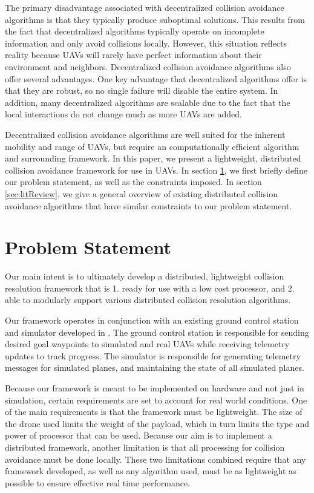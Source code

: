 \documentclass[conference]{IEEEtran}
\begin{document}
The primary disadvantage associated with decentralized collision avoidance algorithms is that they typically produce suboptimal solutions.  This results from the fact that decentralized algorithms typically operate on incomplete information and only avoid collisions locally. However, this situation reflects reality because UAVs will rarely have perfect information about their environment and neighbors. Decentralized collision avoidance algorithms also offer several advantages. One key advantage that decentralized algorithms offer is that they are robust, so no single failure will disable the entire system. In addition, many decentralized algorithms are scalable due to the fact that the local interactions do not change much as more UAVs are added.

Decentralized collision avoidance algorithms are well suited for the inherent mobility and range of UAVs, but require an computationally efficient algorithm and surrounding framework. In this paper, we present a lightweight, distributed collision avoidance framework for use in UAVs. In section \ref{sec:problem}, we first briefly define our problem statement, as well as the constraints imposed. In section \ref{sec:litReview}, we give a general overview of existing distributed collision avoidance algorithms that have similar constraints to our problem statement. 

\section{Problem Statement}
\label{sec:problem}

Our main intent is to ultimately develop a distributed, lightweight collision resolution framework  that is 1. ready for use with a low cost processor, and 2. able to modularly support various distributed collision resolution algorithms. 

Our framework operates in conjunction with an existing ground control station and simulator developed in \cite{holt2012comparison}. The ground control station is responsible for sending desired goal waypoints to simulated and real UAVs while receiving telemetry updates to track progress. The simulator is responsible for generating telemetry messages for simulated planes, and maintaining the state of all simulated planes. 

Because our framework is meant to be implemented on hardware and not just in simulation, certain requirements are set to account for real world conditions. One of the main requirements is that the framework must be lightweight. The size of the drone used limits the weight of the payload, which in turn limits the type and power of processor that can be used. Because our aim is to implement a distributed framework, another limitation is that all processing for collision avoidance must be done locally. These two limitations combined require that any framework developed, as well as any algorithm used, must be as lightweight as possible to ensure effective real time performance.
\end{document}
